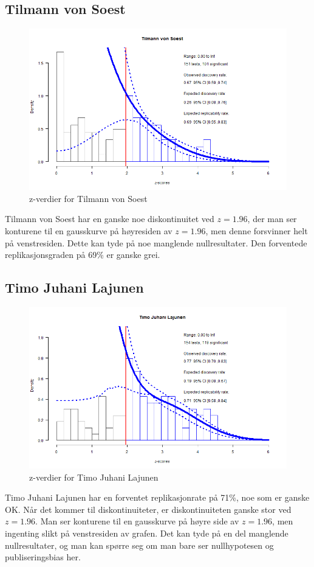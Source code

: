 \documentclass[doc,norsk]{apa7}
\begin{document}
\subsection{Tilmann von Soest}
\begin{figure}[h!]
    \centering
    \includegraphics[width=\textwidth]{images/Tilmann von Soest.png}
    \caption{z-verdier for Tilmann von Soest}
\end{figure}
Tilmann von Soest har en ganske noe diskontinuitet ved $z=1.96$, der man ser konturene til en gausskurve på høyresiden av $z=1.96$, men denne forsvinner helt på venstresiden. Dette kan tyde på noe manglende nullresultater. Den forventede replikasjonsgraden på 69\% er ganske grei.

\subsection{Timo Juhani Lajunen}
\begin{figure}[h!]
    \centering
    \includegraphics[width=\textwidth]{images/Timo Juhani Lajunen.png}
    \caption{z-verdier for Timo Juhani Lajunen}
\end{figure}
Timo Juhani Lajunen har en forventet replikasjonrate på 71\%, noe som er ganske OK. Når det kommer til diskontinuiteter, er diskontinuiteten ganske stor ved $z=1.96$. Man ser konturene til en gausskurve på høyre side av $z=1.96$, men ingenting slikt på venstresiden av grafen. Det kan tyde på en del manglende nullresultater, og man kan spørre seg om man bare ser nullhypotesen og publiseringsbias her.
\end{document}
